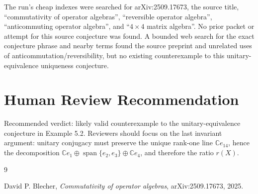 \documentclass[11pt]{article}
\newcommand{\C}{\mathbb C}
\newcommand{\spn}{\operatorname{span}}
\begin{document}
The run's cheap indexes were searched for arXiv:2509.17673, the source title,
``commutativity of operator algebras'', ``reversible operator algebra'',
``anticommuting operator algebra'', and ``\(4\times4\) matrix algebra''.  No
prior packet or attempt for this source conjecture was found.  A bounded web
search for the exact conjecture phrase and nearby terms found the source
preprint and unrelated uses of anticommutation/reversibility, but no existing
counterexample to this unitary-equivalence uniqueness conjecture.

\section*{Human Review Recommendation}

Recommended verdict: likely valid counterexample to the unitary-equivalence
conjecture in Example 5.2.  Reviewers should focus on the last invariant
argument: unitary conjugacy must preserve the unique rank-one line
\(\C e_{14}\), hence the decomposition
\(\C e_1\oplus\spn\{e_2,e_3\}\oplus\C e_4\), and therefore the ratio \(r(X)\).

\begin{thebibliography}{9}

David P. Blecher,
\emph{Commutativity of operator algebras},
arXiv:2509.17673, 2025.

\end{thebibliography}
\end{document}
